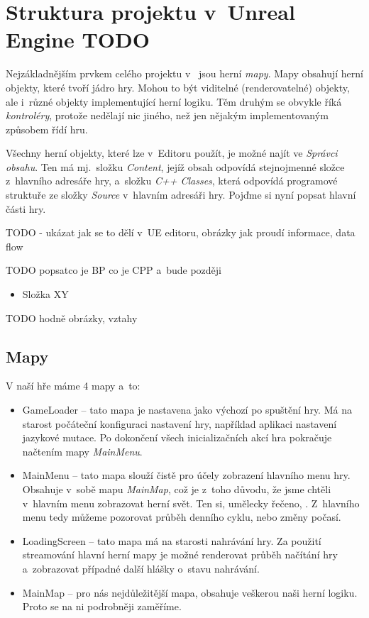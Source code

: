 
\section{Struktura projektu v~Unreal Engine TODO}
\label{sec:ueStructure}

Nejzákladnějším prvkem celého projektu v~\UEu{} jsou herní \textit{mapy}. Mapy obsahují herní objekty, které tvoří jádro hry. Mohou to být viditelné (renderovatelné) objekty, ale i~různé objekty implementující herní logiku. Těm druhým se obvykle říká \textit{kontroléry}, protože nedělají nic jiného, než jen nějakým implementovaným způsobem řídí hru.

Všechny herní objekty, které lze v~Editoru použít, je možné najít ve \textit{Správci obsahu}. Ten má mj.~složku \textit{Content}, jejíž obsah odpovídá stejnojmenné složce z~hlavního adresáře hry, a~složku \textit{C++ Classes}, která odpovídá programové struktuře ze složky \textit{Source} v~hlavním adresáři hry. Pojďme si nyní popsat hlavní části hry.

TODO
- ukázat jak se to dělí v~UE editoru, obrázky jak proudí informace, data flow


TODO  popsatco je BP co je CPP a~bude později 

\begin{itemize}
	\item Složka XY
\end{itemize}


TODO hodně obrázky, vztahy

\subsection{Mapy}

V naší hře máme 4 mapy a~to:

\begin{itemize}
	\item GameLoader -- tato mapa je nastavena jako výchozí po spuštění hry. Má na starost počáteční konfiguraci nastavení hry, například aplikaci nastavení jazykové mutace. Po dokončení všech inicializačních akcí hra pokračuje načtením mapy \textit{MainMenu}.
	\item MainMenu -- tato mapa slouží čistě pro účely zobrazení hlavního menu hry. Obsahuje v~sobě mapu \textit{MainMap}, což je z~toho důvodu, že jsme chtěli v~hlavním menu zobrazovat herní svět. Ten si, umělecky řečeno, . Z~hlavního menu tedy můžeme pozorovat průběh denního cyklu, nebo změny počasí.
	\item LoadingScreen -- tato mapa má na starosti nahrávání hry. Za použití streamování hlavní herní mapy je možné renderovat průběh načítání hry a~zobrazovat případné další hlášky o~stavu nahrávání.
	\item MainMap -- pro nás nejdůležitější mapa, obsahuje veškerou naši herní logiku. Proto se na ni podrobněji zaměříme.
\end{itemize}

